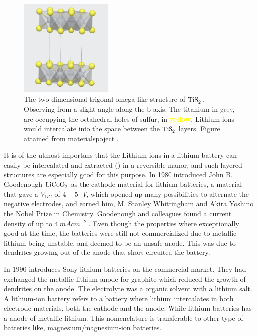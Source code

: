 \begin{figure}[H]
    \centering
    \includegraphics[width=0.4\textwidth]{TiS2.png}
    \caption{The two-dimensional trigonal omega-like structure of $\ce{TiS_2}$. Observing from a slight angle along the b-axis. The titanium in \textcolor{gray}{grey}, are occupying the octahedral holes of sulfur, in \textcolor{yellow}{\textbf{yellow}}. Lithium-ions would intercalate into the space between the $\ce{TiS_2}$ layers. Figure attained from materialspoject \cite{materialsproject:TiS2}.}
    \label{fig:MPTiS2}
\end{figure}

It is of the utmost importans that the Lithium-ions in a lithium battery can easily be intercalated and extracted () in a reversible manor, and such layered structures are especially good for this purpose. In 1980 introduced John B. Goodenough $\ce{LiCoO_2}$ as the cathode material for lithium batteries, a material that gave a $V_{OC}$ of $4-5\text{ } \si{V}$, which opened up many possibilities to alternate the negative electrodes, and earned him, M. Stanley Whittingham and Akira Yoshino the Nobel Prize in Chemistry. Goodenough and colleagues  found a current density of up to $\SI{4}{mAcm^{-2}}$ \cite{mizushima1980lixcoo2} \cite{goodenough1980solid}. Even though the properties where exceptionally good at the time, the batteries were still not commercialized due to metallic lithium being unstable, and deemed to be an unsafe anode. This was due to dendrites growing out of the anode that short circuited the battery. 

In $1990$ introduces Sony lithium batteries on the commercial market. They had exchanged the metallic lithium anode for graphite which reduced the growth of dendrites on the anode. The electrolyte was a organic solvent with a lithium salt. A lithium-ion battery refers to a battery where lithium intercalates in both electrode materials, both the cathode and the anode. While lithium batteries has a anode of metallic lithium. This nomenclature is transferable to other type of batteries like, magnesium/magnesium-ion batteries. 

